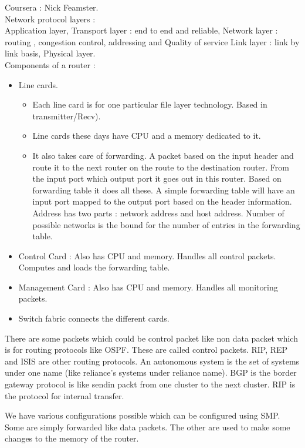 \documentclass[solution,addpoints,12pt]{exam}
\begin{document}
Coursera : Nick Feamster.\\
Network protocol layers :\\
Application layer, Transport layer : end to end and reliable,
Network layer : routing , congestion control, addressing and Quality of service
Link layer : link by link basis, Physical layer.\\

Components of a router :\\
\begin{itemize}
\item Line cards.\\
\begin{itemize}
\item
Each line card is for one particular file layer technology.
Based in transmitter/Recv).
\item
Line cards these days have CPU and a memory dedicated to it.
\item
It also takes care of forwarding. A packet based on the input
header and route it to the next router on the route to the
destination router. From the input port which output port it goes out
in this router. Based on forwarding table it does all these.
A simple forwarding table will have an input port mapped to the output port
based on the header information. Address has two parts : network address
and host address. Number of possible networks is the bound for the number
of entries in the forwarding table.
\end{itemize}
\item Control Card : Also has CPU and memory. Handles all control packets.
Computes and loads the forwarding table.
\item Management Card : Also has CPU and memory. Handles all monitoring
packets.
\item Switch fabric connects the different cards.
\end{itemize}

There are some packets which could be control packet like non data
packet which is for routing protocols like OSPF. These are called control
packets. RIP, REP and ISIS are other routing protocols. An autonomous system
is the set of systems under one name (like reliance's systems under
reliance name). BGP is the border gateway protocol is like sendin packt
from one cluster to the next cluster. RIP is the protocol for internal
transfer.

We have various configurations possible which can be configured using SMP.\\
Some are simply forwarded like data packets. The other are used to make
some changes to the memory of the router.
\end{document}
